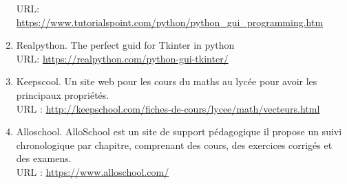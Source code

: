 \documentclass[a4paper]{report}
\newcommand{\link}[1]{{\color{blue}\href{#1}{#1}}}
\begin{document}
\begin{enumerate}
    URL: \link{https://www.tutorialspoint.com/python/python_gui_programming.htm}
    \item Realpython. The perfect guid for Tkinter in python\\
    URL: \link{https://realpython.com/python-gui-tkinter/}
    \item Keepscool. Un site web pour les cours du maths au lycée pour avoir les principaux propriétés.\\ 
    URL : \link{http://keepschool.com/fiches-de-cours/lycee/math/vecteurs.html}
    \item Alloschool. AlloSchool est un site de support pédagogique il propose un suivi chronologique par chapitre, comprenant des cours, des exercices corrigés et des examens.\\
    URL : \link{https://www.alloschool.com/}
    
\end{enumerate}
\end{document}
